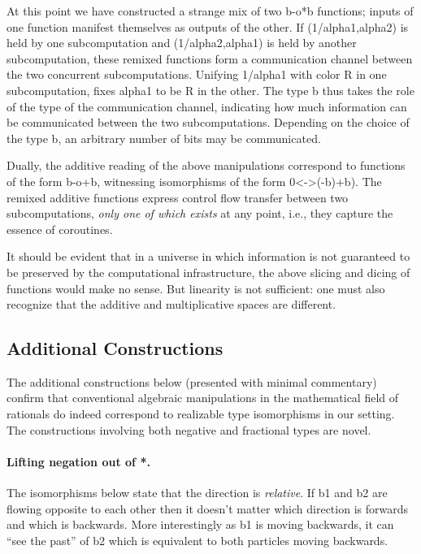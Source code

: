 \documentclass[preprint]{sigplanconf}
\begin{document}
At this point we have constructed a strange mix of two {{b-o*b}} functions;
inputs of one function manifest themselves as outputs of the other. If
{{(1/alpha1,alpha2)}} is held by one subcomputation and {{(1/alpha2,alpha1)}}
is held by another subcomputation, these remixed functions form a
communication channel between the two concurrent subcomputations. Unifying
{{1/alpha1}} with {{color}} {{R}} in one subcomputation, fixes {{alpha1}} to
be {{R}} in the other. The type {{b}} thus takes the role of the type of the
communication channel, indicating how much information can be communicated
between the two subcomputations.  Depending on the choice of the type {{b}},
an arbitrary number of bits may be communicated.

Dually, the additive reading of the above manipulations correspond to
functions of the form {{b-o+b}}, witnessing isomorphisms of the form
{{0<->(-b)+b}}). The remixed additive functions express control flow transfer
between two subcomputations, \emph{only one of which exists} at any point,
i.e., they capture the essence of coroutines. 

It should be evident that in a universe in which information is not
guaranteed to be preserved by the computational infrastructure, the above
slicing and dicing of functions would make no sense. But linearity is not
sufficient: one must also recognize that the additive and multiplicative
spaces are different. 

\subsection{Additional Constructions}
\label{sec:specific-constructions}

The additional constructions below (presented with minimal commentary)
confirm that conventional algebraic manipulations in the mathematical field
of rationals do indeed correspond to realizable type isomorphisms in our
setting. The constructions involving both negative and fractional types are
novel.

\paragraph*{Lifting negation out of {{*}}.}
The isomorphisms below state that the direction is \emph{relative}. If {{b1}}
and {{b2}} are flowing opposite to each other then it doesn't matter which
direction is forwards and which is backwards. More interestingly as {{b1}} is
moving backwards, it can ``see the past'' of {{b2}} which is equivalent to
both particles moving backwards.
\end{document}
